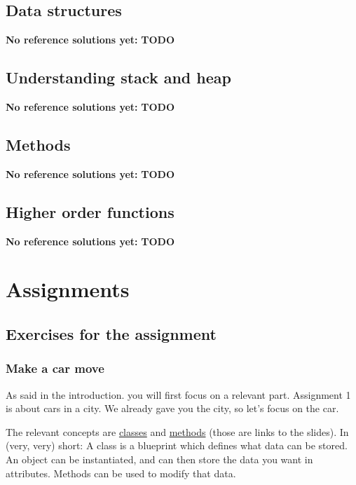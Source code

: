     \section{Data structures}
        \textbf{No reference solutions yet:}
        \textbf{TODO}

    \section{Understanding stack and heap}
        \textbf{No reference solutions yet:}
        \textbf{TODO}

    \section{Methods}
        \textbf{No reference solutions yet:}
        \textbf{TODO}

    \section{Higher order functions}
        \textbf{No reference solutions yet:}
        \textbf{TODO}

\chapter{Assignments}
\section{Exercises for the assignment}
    \subsection{Make a car move}
        As said in the introduction. you will first focus on a relevant part.
        Assignment 1 is about cars in a city.
        We already gave you the city, so let's focus on the car.

        The relevant concepts are \href{https://github.com/hogeschool/INFDEV02-2/raw/master/Slides/Lecture%20I%20-%20data%20structures.pdf}{classes} and \href{https://github.com/hogeschool/INFDEV02-2/raw/master/Slides/Lecture%20V%20-%20methods.pdf}{methods} (those are links to the slides).
            In (very, very) short: A class is a blueprint which defines what data can be stored.
            An object can be instantiated, and can then store the data you want in attributes.
            Methods can be used to modify that data.

